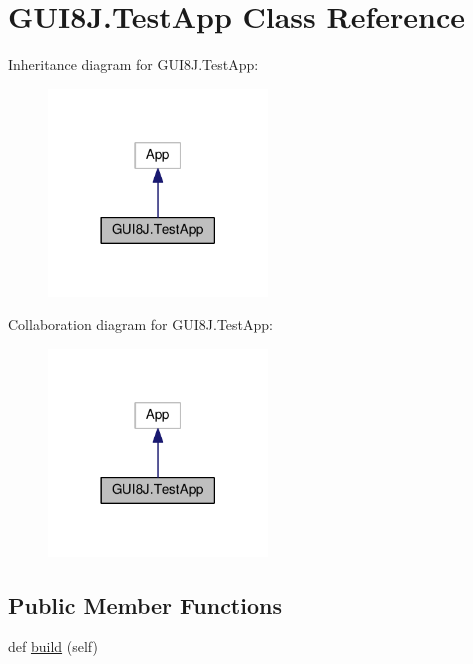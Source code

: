 \hypertarget{classGUI8J_1_1TestApp}{}\section{G\+U\+I8\+J.\+Test\+App Class Reference}
\label{classGUI8J_1_1TestApp}


Inheritance diagram for G\+U\+I8\+J.\+Test\+App\+:
\nopagebreak
\begin{figure}[H]
\begin{center}
\leavevmode
\includegraphics[width=165pt]{classGUI8J_1_1TestApp__inherit__graph}
\end{center}
\end{figure}


Collaboration diagram for G\+U\+I8\+J.\+Test\+App\+:
\nopagebreak
\begin{figure}[H]
\begin{center}
\leavevmode
\includegraphics[width=165pt]{classGUI8J_1_1TestApp__coll__graph}
\end{center}
\end{figure}
\subsection*{Public Member Functions}
\begin{DoxyCompactItemize}
\item 
def \hyperlink{classGUI8J_1_1TestApp_a2b48503b57bdfb7a248eac843289ca19}{build} (self)
\end{DoxyCompactItemize}
